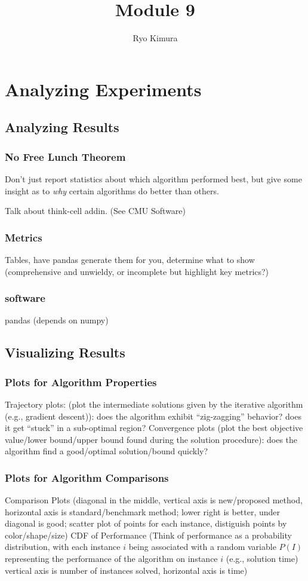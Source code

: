 \documentclass[12pt]{article}
\begin{document}
\title{Module 9}
\author{Ryo Kimura}
\date{}
\maketitle

\section{Analyzing Experiments}
\subsection{Analyzing Results}
\subsubsection{No Free Lunch Theorem}
Don't just report statistics about which algorithm performed best, but give some insight as to \emph{why} certain algorithms do better than others.

Talk about think-cell addin. (See CMU Software)

\subsubsection{Metrics}
Tables, have pandas generate them for you, determine what to show (comprehensive and unwieldy, or incomplete but highlight key metrics?)
\subsubsection{software}
pandas (depends on numpy)

\subsection{Visualizing Results}
\subsubsection{Plots for Algorithm Properties}
Trajectory plots: (plot the intermediate solutions given by the iterative algorithm (e.g., gradient descent)): does the algorithm exhibit ``zig-zagging'' behavior? does it get ``stuck'' in a sub-optimal region?
Convergence plots (plot the best objective value/lower bound/upper bound found during the solution procedure): does the algorithm find a good/optimal solution/bound quickly?

\subsubsection{Plots for Algorithm Comparisons}
Comparison Plots (diagonal in the middle, vertical axis is new/proposed method, horizontal axis is standard/benchmark method; lower right is better, under diagonal is good; scatter plot of points for each instance, distiguish points by color/shape/size)
CDF of Performance (Think of performance as a probability distribution, with each instance $i$ being associated with a random variable $P(I)$ representing the performance of the algorithm on instance $i$ (e.g., solution time) vertical axis is number of instances solved, horizontal axis is time)
\end{document}
